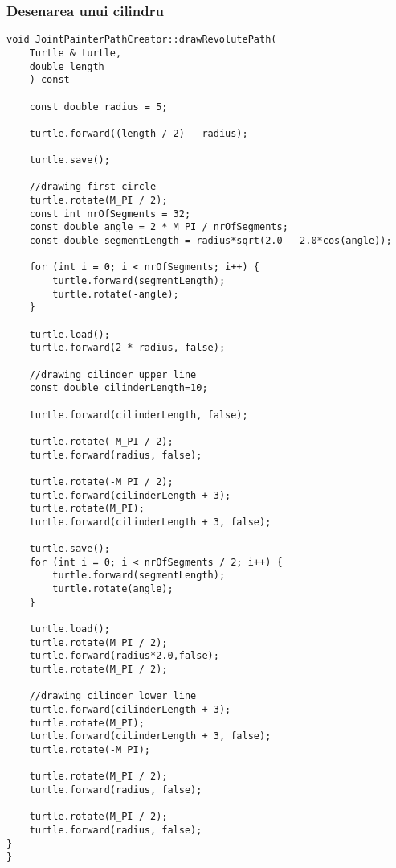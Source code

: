 \subsubsection{Desenarea unui cilindru}
\begin{lstlisting}
void JointPainterPathCreator::drawRevolutePath(
    Turtle & turtle, 
    double length
    ) const
    
    const double radius = 5;

    turtle.forward((length / 2) - radius);

    turtle.save();
    
    //drawing first circle
    turtle.rotate(M_PI / 2);
    const int nrOfSegments = 32;
    const double angle = 2 * M_PI / nrOfSegments;    
    const double segmentLength = radius*sqrt(2.0 - 2.0*cos(angle));

    for (int i = 0; i < nrOfSegments; i++) {
        turtle.forward(segmentLength);
        turtle.rotate(-angle);
    }

    turtle.load();
    turtle.forward(2 * radius, false);

    //drawing cilinder upper line
    const double cilinderLength=10;

    turtle.forward(cilinderLength, false);

    turtle.rotate(-M_PI / 2);
    turtle.forward(radius, false);

    turtle.rotate(-M_PI / 2);
    turtle.forward(cilinderLength + 3);
    turtle.rotate(M_PI);
    turtle.forward(cilinderLength + 3, false);

    turtle.save();
    for (int i = 0; i < nrOfSegments / 2; i++) {
        turtle.forward(segmentLength);
        turtle.rotate(angle);
    }

    turtle.load();
    turtle.rotate(M_PI / 2);
    turtle.forward(radius*2.0,false);
    turtle.rotate(M_PI / 2);

    //drawing cilinder lower line
    turtle.forward(cilinderLength + 3);
    turtle.rotate(M_PI);
    turtle.forward(cilinderLength + 3, false);
    turtle.rotate(-M_PI);

    turtle.rotate(M_PI / 2);
    turtle.forward(radius, false);

    turtle.rotate(M_PI / 2);
    turtle.forward(radius, false);
}
}
\end{lstlisting}
